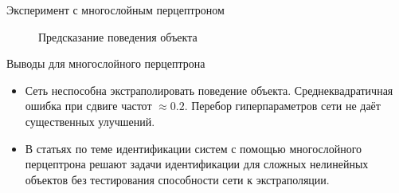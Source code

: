 \documentclass{beamer}
\begin{document}
\begin{frame}{Эксперимент с многослойным перцептроном}
\begin{figure}[!ht]
     \hfill
     \caption{Предсказание поведения объекта}
     \label{fig:dummy}
\end{figure} 
\end{frame}

\begin{frame}{Выводы для многослойного перцептрона}
\begin{itemize}
\item Сеть неспособна экстраполировать поведение объекта. Среднеквадратичная ошибка при сдвиге частот $\approx 0.2$. Перебор гиперпараметров сети не даёт существенных улучшений. 
\item В статьях по теме идентификации систем с помощью многослойного перцептрона решают задачи идентификации для сложных нелинейных объектов без тестирования способности сети к экстраполяции. 
\end{itemize}
\end{frame}
\end{document}
